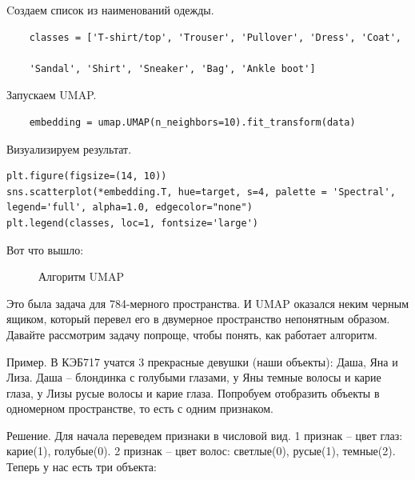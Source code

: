 	Cоздаем список из наименований одежды.
\begin{verbatim}
	classes = ['T-shirt/top', 'Trouser', 'Pullover', 'Dress', 'Coat', 
	
	'Sandal', 'Shirt', 'Sneaker', 'Bag', 'Ankle boot']
\end{verbatim}

Запускаем UMAP.

\begin{verbatim}
	embedding = umap.UMAP(n_neighbors=10).fit_transform(data)
\end{verbatim}

	Визуализируем результат.
	\begin{verbatim}
plt.figure(figsize=(14, 10))
sns.scatterplot(*embedding.T, hue=target, s=4, palette = 'Spectral',
legend='full', alpha=1.0, edgecolor="none")
plt.legend(classes, loc=1, fontsize='large')
	\end{verbatim}

Вот что вышло:

\begin{figure}[bh]
	\noindent{}
	\caption{Алгоритм UMAP}
	\label{figCurves}
\end{figure} 

Это была задача для 784-мерного пространства. И UMAP оказался неким черным ящиком, который перевел его в двумерное пространство непонятным образом. Давайте рассмотрим задачу попроще, чтобы понять, как работает алгоритм.

Пример. В КЭБ717 учатся 3 прекрасные девушки (наши объекты): Даша, Яна и Лиза. Даша -- блондинка с голубыми глазами, у Яны темные волосы и карие глаза, у Лизы русые волосы и карие глаза. Попробуем отобразить объекты в одномерном пространстве, то есть с одним признаком.

Решение. Для начала переведем признаки в числовой вид. 1 признак -- цвет глаз: карие(1), голубые(0). 2 признак -- цвет волос: светлые(0), русые(1), темные(2). Теперь у нас есть три объекта:


